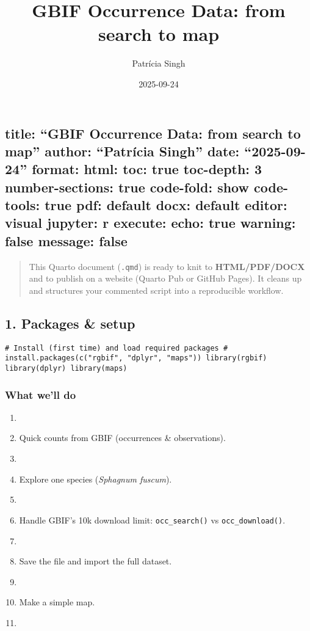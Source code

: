 \documentclass[
  letterpaper,
  DIV=11,
  numbers=noendperiod]{scrartcl}
\title{GBIF Occurrence Data: from search to map}
\author{Patrícia Singh}
\date{2025-09-24}
\begin{document}
\maketitle


\subsection{title: ``GBIF Occurrence Data: from search to map'' author:
``Patrícia Singh'' date: ``2025-09-24'' format: html: toc: true
toc-depth: 3 number-sections: true code-fold: show code-tools: true pdf:
default docx: default editor: visual jupyter: r execute: echo: true
warning: false message:
false}\label{title-gbif-occurrence-data-from-search-to-map-author-patruxedcia-singh-date-2025-09-24-format-html-toc-true-toc-depth-3-number-sections-true-code-fold-show-code-tools-true-pdf-default-docx-default-editor-visual-jupyter-r-execute-echo-true-warning-false-message-false}

\begin{quote}
This Quarto document (\texttt{.qmd}) is ready to knit to
\textbf{HTML/PDF/DOCX} and to publish on a website (Quarto Pub or GitHub
Pages). It cleans up and structures your commented script into a
reproducible workflow.
\end{quote}

\subsection{1. Packages \& setup}\label{packages-setup}

\begin{verbatim}
# Install (first time) and load required packages # install.packages(c("rgbif", "dplyr", "maps")) library(rgbif) library(dplyr) library(maps) 
\end{verbatim}

\subsubsection{What we'll do}\label{what-well-do}

\begin{enumerate}
\def\labelenumi{\arabic{enumi}.}
\item
\item
  Quick counts from GBIF (occurrences \& observations).
\item
\item
  Explore one species (\emph{Sphagnum fuscum}).
\item
\item
  Handle GBIF's 10k download limit: \texttt{occ\_search()} vs
  \texttt{occ\_download()}.
\item
\item
  Save the file and import the full dataset.
\item
\item
  Make a simple map.
\item
\end{enumerate}
\end{document}
